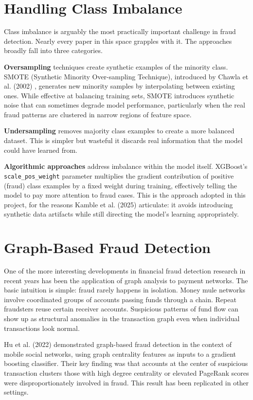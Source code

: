 \section{Handling Class Imbalance}

Class imbalance is arguably the most practically important challenge in fraud detection. Nearly every paper in this space grapples with it. The approaches broadly fall into three categories.

\textbf{Oversampling} techniques create synthetic examples of the minority class. SMOTE (Synthetic Minority Over-sampling Technique), introduced by Chawla et al. (2002) \cite{chawla2002}, generates new minority samples by interpolating between existing ones. While effective at balancing training sets, SMOTE introduces synthetic noise that can sometimes degrade model performance, particularly when the real fraud patterns are clustered in narrow regions of feature space.

\textbf{Undersampling} removes majority class examples to create a more balanced dataset. This is simpler but wasteful it discards real information that the model could have learned from.

\textbf{Algorithmic approaches} address imbalance within the model itself. XGBoost's \texttt{scale\_pos\_weight} parameter multiplies the gradient contribution of positive (fraud) class examples by a fixed weight during training, effectively telling the model to pay more attention to fraud cases. This is the approach adopted in this project, for the reasons Kamble et al. (2025) articulate: it avoids introducing synthetic data artifacts while still directing the model's learning appropriately.

\section{Graph-Based Fraud Detection}

One of the more interesting developments in financial fraud detection research in recent years has been the application of graph analysis to payment networks. The basic intuition is simple: fraud rarely happens in isolation. Money mule networks involve coordinated groups of accounts passing funds through a chain. Repeat fraudsters reuse certain receiver accounts. Suspicious patterns of fund flow can show up as structural anomalies in the transaction graph even when individual transactions look normal.

Hu et al. (2022) \cite{hu2022} demonstrated graph-based fraud detection in the context of mobile social networks, using graph centrality features as inputs to a gradient boosting classifier. Their key finding was that accounts at the center of suspicious transaction clusters those with high degree centrality or elevated PageRank scores were disproportionately involved in fraud. This result has been replicated in other settings.

